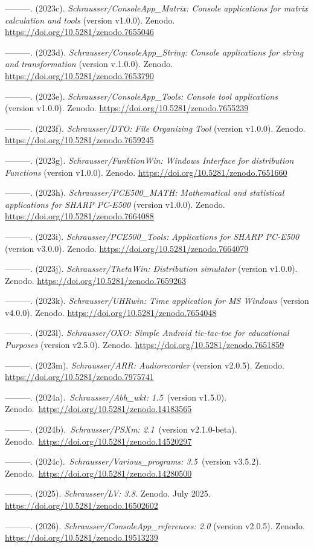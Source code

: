 \documentclass[
]{article}
\begin{document}
---------. (2023c). \emph{Schrausser/ConsoleApp\_Matrix: Console
applications for matrix calculation and tools} (version v1.0.0). Zenodo.
\url{https://doi.org/10.5281/zenodo.7655046}

---------. (2023d). \emph{Schrausser/ConsoleApp\_String: Console
applications for string and transformation} (version v.1.0.0). Zenodo.
\url{https://doi.org/10.5281/zenodo.7653790}

---------. (2023e). \emph{Schrausser/ConsoleApp\_Tools: Console tool
applications} (version v1.0.0). Zenodo.
\url{https://doi.org/10.5281/zenodo.7655239}

---------. (2023f). \emph{Schrausser/DTO: File Organizing Tool} (version
v1.0.0). Zenodo. \url{https://doi.org/10.5281/zenodo.7659245}

---------. (2023g). \emph{Schrausser/FunktionWin: Windows Interface for
distribution Functions} (version v1.0.0). Zenodo.
\url{https://doi.org/10.5281/zenodo.7651660}

---------. (2023h). \emph{Schrausser/PCE500\_MATH: Mathematical and
statistical applications for SHARP PC-E500} (version v1.0.0). Zenodo.
\url{https://doi.org/10.5281/zenodo.7664088}

---------. (2023i). \emph{Schrausser/PCE500\_Tools: Applications for
SHARP PC-E500} (version v3.0.0). Zenodo.
\url{https://doi.org/10.5281/zenodo.7664079}

---------. (2023j). \emph{Schrausser/ThetaWin: Distribution simulator}
(version v1.0.0). Zenodo. \url{https://doi.org/10.5281/zenodo.7659263}

---------. (2023k). \emph{Schrausser/UHRwin: Time application for MS
Windows} (version v4.0.0). Zenodo.
\url{https://doi.org/10.5281/zenodo.7654048}

---------. (2023l). \emph{Schrausser/OXO: Simple Android tic-tac-toe for
educational Purposes} (version v2.5.0). Zenodo.
\url{https://doi.org/10.5281/zenodo.7651859}

---------. (2023m). \emph{Schrausser/ARR: Audiorecorder} (version
v2.0.5). Zenodo. \url{https://doi.org/10.5281/zenodo.7975741}

---------. (2024a).~\emph{Schrausser/Abh\_wkt: 1.5}~(version v1.5.0).
Zenodo.~\url{https://doi.org/10.5281/zenodo.14183565}

---------. (2024b).~\emph{Schrausser/PSXm: 2.1}~(version v2.1.0-beta).
Zenodo.~\url{https://doi.org/10.5281/zenodo.14520297}

---------. (2024c).~\emph{Schrausser/Various\_programs: 3.5}~(version
v3.5.2). Zenodo.~\url{https://doi.org/10.5281/zenodo.14280500}

---------. (2025). \emph{Schrausser/LV: 3.8}. Zenodo. July 2025.
\url{https://doi.org/10.5281/zenodo.16502602}

---------. (2026). \emph{Schrausser/ConsoleApp\_references: 2.0}
(version v2.0.5). Zenodo. \url{https://doi.org/10.5281/zenodo.19513239}
\end{document}
